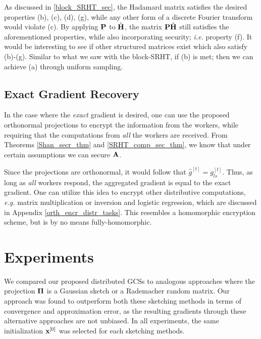 \documentclass[journal,letterpaper,onecolumn,twoside,nofonttune]{IEEEtran}
\newcommand{\xb}{\bold{x}}
\newcommand{\Pibold}{\bold{\Pi}}
\newcommand{\gh}{\hat{g}}
\newcommand{\Pb}{\bold{P}}
\newcommand{\Ab}{\bold{A}}
\newcommand{\Hbh}{\hat{\bold{H}}}
\begin{document}
As discussed in \ref{block_SRHT_sec}, the Hadamard matrix satisfies the desired properties (b), (c), (d), (g), while any other form of a discrete Fourier transform would violate (c). By applying $\Pb$ to $\Hbh$, the matrix $\Pb\Hbh$ still satisfies the aforementioned properties, while also incorporating security; \textit{i.e.} property (f). It would be interesting to see if other structured matrices exist which also satisfy (b)-(g). Similar to what we saw with the block-SRHT, if (b) is met; then we can achieve (a) through uniform sampling.

\subsection{Exact Gradient Recovery}
\label{exact_grad_subsec}

In the case where the \textit{exact} gradient is desired, one can use the proposed orthonormal projections to encrypt the information from the workers, while requiring that the computations from \textit{all} the workers are received. From Theorems \ref{Shan_secr_thm} and \ref{SRHT_comp_sec_thm}, we know that under certain assumptions we can secure $\Ab$.%

Since the projections are orthonormal, it would follow that $\gh^{[t]}=g_{ls}^{[t]}$. Thus, as long as \textit{all} workers respond, the aggregated gradient is equal to the exact gradient. One can utilize this idea to encrypt other distributive computations, \textit{e.g.} matrix multiplication or inversion and logistic regression, which are discussed in Appendix \ref{orth_encr_distr_tasks}. This resembles a homomorphic encryption scheme, but is by no means fully-homomorphic.

\section{Experiments}
\label{exper_sec}

We compared our proposed distributed GCSs to analogous approaches where the projection $\Pibold$ is a Gaussian sketch or a Rademacher random matrix. Our approach was found to outperform both these sketching methods in terms of convergence and approximation error, as the resulting gradients through these alternative approaches are not unbiased. In all experiments, the same initialization $\xb^{[0]}$ was selected for each sketching methods.
\end{document}
